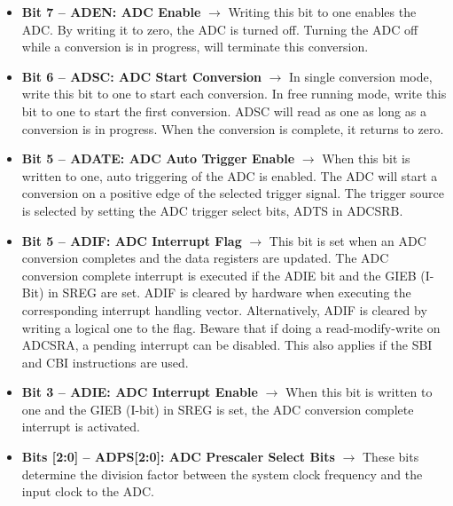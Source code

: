 \begin{itemize}
    \item \textbf{Bit 7 – ADEN: ADC Enable} $\bm{\rightarrow}$  Writing this bit to one enables the ADC. By writing it to zero, the ADC is turned off. Turning the ADC off while a conversion is in progress, will terminate this conversion.
    
    \item \textbf{Bit 6 – ADSC: ADC Start Conversion} $\bm{\rightarrow}$ In single conversion mode, write this bit to one to start each conversion. In free running mode, write this bit to one to start the
    first conversion. ADSC will read as one as long as a conversion is in progress. When the conversion is complete, it returns to zero.

    \item \textbf{Bit 5 – ADATE: ADC Auto Trigger Enable} $\bm{\rightarrow}$ When this bit is written to one, auto triggering of the ADC is enabled. The ADC will start a conversion on a positive edge of the selected trigger signal. The trigger source is selected by setting the ADC trigger select bits, ADTS in ADCSRB.
    
    \item \textbf{Bit 5 – ADIF: ADC Interrupt Flag} $\bm{\rightarrow}$ This bit is set when an ADC conversion completes and the data registers are updated. The ADC conversion complete interrupt is executed if the ADIE bit and the GIEB (I-Bit) in SREG are set. ADIF is cleared by hardware when executing the corresponding interrupt handling vector. Alternatively, ADIF is cleared by writing a logical one to the flag. Beware that if doing a read-modify-write on ADCSRA, a pending interrupt can be disabled. This also applies if the SBI and CBI instructions are used.
    
    \item \textbf{Bit 3 – ADIE: ADC Interrupt Enable} $\bm{\rightarrow}$ When this bit is written to one and the GIEB (I-bit) in SREG is set, the ADC conversion complete interrupt is activated.
    
    \item \textbf{Bits [2:0] – ADPS[2:0]: ADC Prescaler Select Bits} $\bm{\rightarrow}$ These bits determine the division factor between the system clock frequency and the input clock to the ADC.
    
\end{itemize}

